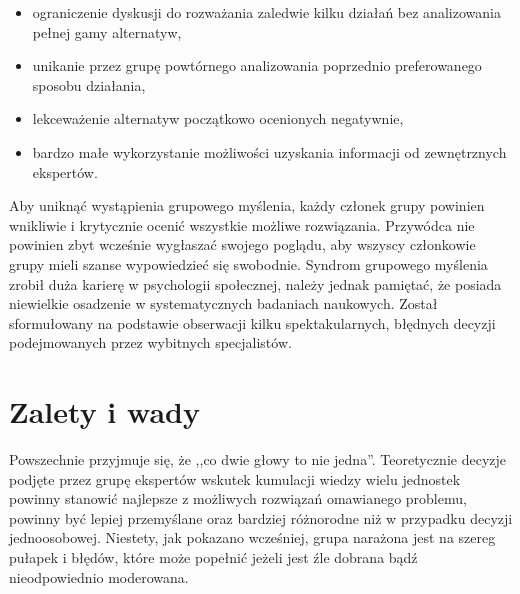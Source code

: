 \begin{itemize}
  \item ograniczenie dyskusji do rozważania zaledwie kilku działań bez analizowania pełnej gamy alternatyw,
  \item unikanie przez grupę powtórnego analizowania poprzednio preferowanego sposobu działania,
  \item lekceważenie alternatyw początkowo ocenionych negatywnie,
  \item bardzo małe wykorzystanie możliwości uzyskania informacji od
  zewnętrznych ekspertów.
\end{itemize}

Aby uniknąć wystąpienia grupowego myślenia, każdy członek grupy powinien
wnikliwie i krytycznie ocenić wszystkie możliwe rozwiązania. Przywódca nie
powinien zbyt wcześnie wygłaszać swojego poglądu, aby wszyscy członkowie grupy
mieli szanse wypowiedzieć się swobodnie. Syndrom grupowego myślenia zrobił duża
karierę w psychologii społecznej, należy jednak pamiętać, że posiada niewielkie
osadzenie w systematycznych badaniach naukowych. Został sformułowany na
podstawie obserwacji kilku spektakularnych, błędnych decyzji podejmowanych przez
wybitnych specjalistów.

\section{Zalety i wady}
Powszechnie przyjmuje się, że ,,co dwie głowy to nie jedna''. Teoretycznie
decyzje podjęte przez grupę ekspertów wskutek kumulacji wiedzy wielu jednostek 
powinny stanowić najlepsze z możliwych rozwiązań omawianego problemu, 
powinny być lepiej przemyślane oraz bardziej różnorodne niż w przypadku decyzji jednoosobowej. 
Niestety, jak pokazano wcześniej, grupa narażona jest na szereg pułapek i błędów, 
które może popełnić jeżeli jest źle dobrana bądź nieodpowiednio moderowana.

